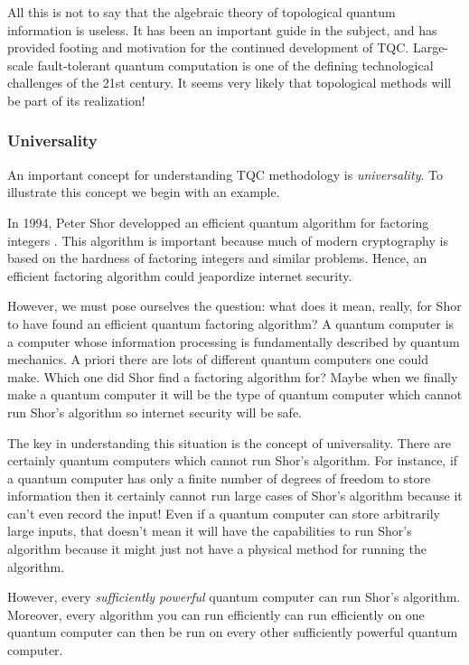 All this is not to say that the algebraic theory of topological quantum information is useless. It has been an important guide in the subject, and has provided footing and motivation for the continued development of TQC. Large-scale fault-tolerant quantum computation is one of the defining technological challenges of the 21st century. It seems very likely that topological methods will be part of its realization!

\subsubsection{Universality}

An important concept for understanding TQC methodology is \textit{universality}. To illustrate this concept we begin with an example.

In 1994, Peter Shor developped an efficient quantum algorithm for factoring integers \cite{shor1994algorithms}. This algorithm is important because much of modern cryptography is based on the hardness of factoring integers and similar problems. Hence, an efficient factoring algorithm could jeapordize internet security.

However, we must pose ourselves the question: what does it mean, really, for Shor to have found an efficient quantum factoring algorithm? A quantum computer is a computer whose information processing is fundamentally described by quantum mechanics. A priori there are lots of different quantum computers one could make. Which one did Shor find a factoring algorithm for? Maybe when we finally make a quantum computer it will be the type of quantum computer which cannot run Shor's algorithm so internet security will be safe.

The key in understanding this situation is the concept of universality. There are certainly quantum computers which cannot run Shor's algorithm. For instance, if a quantum computer has only a finite number of degrees of freedom to store information then it certainly cannot run large cases of Shor's algorithm because it can't even record the input! Even if a quantum computer can store arbitrarily large inputs, that doesn't mean it will have the capabilities to run Shor's algorithm because it might just not have a physical method for running the algorithm.

However, every \textit{sufficiently powerful} quantum computer can run Shor's algorithm. Moreover, every algorithm you can run efficiently can run efficiently on one quantum computer can then be run on every other sufficiently powerful quantum computer.


